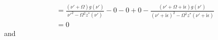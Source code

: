 \begin{equation}
\begin{split}
&= \frac{(\nu' + \Omega)g(\nu')}{\nu'^2 - \Omega^2z^*(\nu')} - 0 - 0 + 0 - \frac{(\nu' + \Omega + \mathrm{i}\epsilon)g(\nu')}{(\nu' + \mathrm{i}\epsilon)^2 - \Omega^2z^*(\nu' + \mathrm{i}\epsilon)}\\
&= 0
\end{split}
\end{equation}
and
